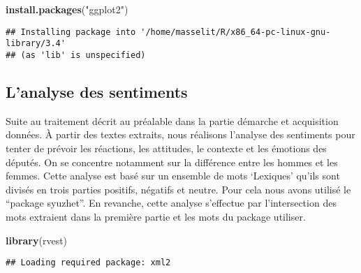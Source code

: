 \documentclass[]{article}
\newenvironment{Shaded}{\begin{snugshade}}{\end{snugshade}}
\newcommand{\KeywordTok}[1]{\textcolor[rgb]{0.13,0.29,0.53}{\textbf{#1}}}
\newcommand{\StringTok}[1]{\textcolor[rgb]{0.31,0.60,0.02}{#1}}
\newcommand{\CommentTok}[1]{\textcolor[rgb]{0.56,0.35,0.01}{\textit{#1}}}
\newcommand{\OperatorTok}[1]{\textcolor[rgb]{0.81,0.36,0.00}{\textbf{#1}}}
\newcommand{\NormalTok}[1]{#1}
\begin{document}
\begin{Shaded}
\begin{Highlighting}[]
\KeywordTok{install.packages}\NormalTok{(}\StringTok{"ggplot2"}\NormalTok{)}
\end{Highlighting}
\end{Shaded}

\begin{verbatim}
## Installing package into '/home/masselit/R/x86_64-pc-linux-gnu-library/3.4'
## (as 'lib' is unspecified)
\end{verbatim}

\subsection{L'analyse des sentiments}\label{lanalyse-des-sentiments}

Suite au traitement décrit au préalable dans la partie démarche et
acquisition données. À partir des textes extraits, nous réalisons
l'analyse des sentiments pour tenter de prévoir les réactions, les
attitudes, le contexte et les émotions des députés. On se concentre
notamment sur la différence entre les hommes et les femmes. Cette
analyse est basé sur un ensemble de mots `Lexiques' qu'ils sont divisés
en trois parties positifs, négatifs et neutre. Pour cela nous avons
utilisé le ``package syuzhet''. En revanche, cette analyse s'effectue
par l'intersection des mots extraient dans la première partie et les
mots du package utiliser.

\begin{Shaded}
\begin{Highlighting}[]
\KeywordTok{library}\NormalTok{(rvest)}
\end{Highlighting}
\end{Shaded}

\begin{verbatim}
## Loading required package: xml2
\end{verbatim}

\begin{Shaded}
\end{Shaded}
\end{document}
